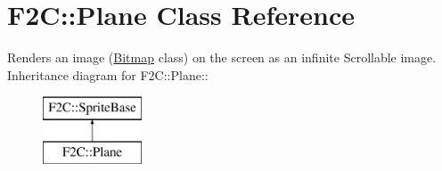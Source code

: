 \hypertarget{class_f2_c_1_1_plane}{
\section{F2C::Plane Class Reference}
\label{class_f2_c_1_1_plane}
}


Renders an image (\hyperlink{class_f2_c_1_1_bitmap}{Bitmap} class) on the screen as an infinite Scrollable image.  
Inheritance diagram for F2C::Plane::\begin{figure}[H]
\begin{center}
\leavevmode
\includegraphics[height=2cm]{class_f2_c_1_1_plane}
\end{center}
\end{figure}
